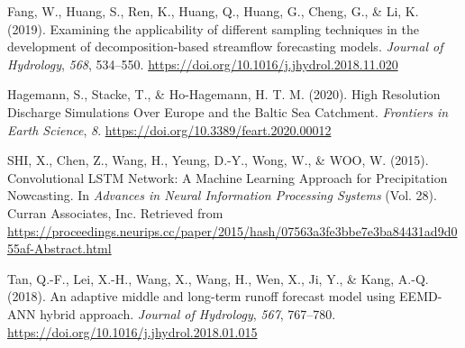 \documentclass[
]{agujournal2019}
\newlength{\cslhangindent}
\newlength{\cslentryspacingunit} %
\newenvironment{CSLReferences}[2] %
 {%
  \setlength{\parindent}{0pt}
  \ifodd #1
  \let\oldpar\par
  \def\par{\hangindent=\cslhangindent\oldpar}
  \fi
  \setlength{\parskip}{#2\cslentryspacingunit}
 }%
 {}
\begin{document}
\hypertarget{refs}{}
\begin{CSLReferences}{1}{0}
\vspace{1em}

\leavevmode{}%
Fang, W., Huang, S., Ren, K., Huang, Q., Huang, G., Cheng, G., \& Li, K.
(2019). Examining the applicability of different sampling techniques in
the development of decomposition-based streamflow forecasting models.
\emph{Journal of Hydrology}, \emph{568}, 534--550.
\url{https://doi.org/10.1016/j.jhydrol.2018.11.020}

\leavevmode{}%
Hagemann, S., Stacke, T., \& Ho-Hagemann, H. T. M. (2020). High
{Resolution Discharge Simulations Over Europe} and the {Baltic Sea
Catchment}. \emph{Frontiers in Earth Science}, \emph{8}.
\url{https://doi.org/10.3389/feart.2020.00012}

\leavevmode{}%
SHI, X., Chen, Z., Wang, H., Yeung, D.-Y., Wong, W., \& WOO, W. (2015).
Convolutional {LSTM Network}: {A Machine Learning Approach} for
{Precipitation Nowcasting}. In \emph{Advances in {Neural Information
Processing Systems}} (Vol. 28). Curran Associates, Inc. Retrieved from
\url{https://proceedings.neurips.cc/paper/2015/hash/07563a3fe3bbe7e3ba84431ad9d055af-Abstract.html}

\leavevmode{}%
Tan, Q.-F., Lei, X.-H., Wang, X., Wang, H., Wen, X., Ji, Y., \& Kang,
A.-Q. (2018). An adaptive middle and long-term runoff forecast model
using {EEMD-ANN} hybrid approach. \emph{Journal of Hydrology},
\emph{567}, 767--780.
\url{https://doi.org/10.1016/j.jhydrol.2018.01.015}

\end{CSLReferences}
\end{document}
